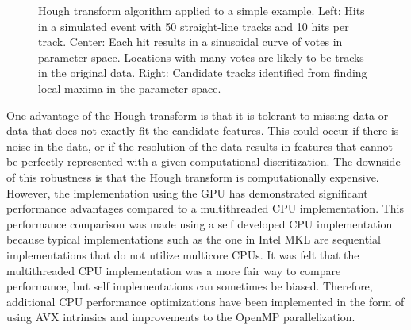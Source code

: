 \documentclass{JINST}
\begin{document}
\begin{figure}[!Hhtb]
\begin{center}
  \caption{Hough transform algorithm applied to a simple example. Left: Hits in a simulated event with 50
    straight-line tracks and 10 hits per track. Center: Each hit results in a sinusoidal curve of votes in parameter
    space. Locations with many votes are likely to be tracks in the original data. Right:
    Candidate tracks identified from finding local maxima in the parameter space.\label{fig:hough}}
\end{center}
\end{figure}

One advantage of the Hough transform is that it is tolerant to missing data or data that does not exactly fit the candidate features.  This could occur if there is noise in the data, or if the resolution of the data results in features that cannot be perfectly represented with a given computational discritization.  The downside of this robustness is that the Hough transform is computationally expensive.  However, the implementation using the GPU has demonstrated significant performance advantages compared to a multithreaded CPU implementation.  This performance comparison was made using a self developed CPU implementation because typical implementations such as the one in Intel MKL are sequential implementations that do not utilize multicore CPUs.  It was felt that the multithreaded CPU implementation was a more fair way to compare performance, but self implementations can sometimes be biased.  Therefore, additional CPU performance optimizations have been implemented in the form of using AVX intrinsics and improvements to the OpenMP parallelization.
\end{document}
